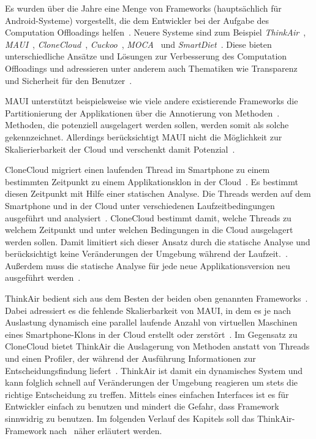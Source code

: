\documentclass{sigchi}
\begin{document}
Es wurden über die Jahre eine Menge von Frameworks (hauptsächlich für Android-Systeme) vorgestellt, die dem Entwickler bei der Aufgabe des Computation Offloadings helfen~\cite{o4}.
Neuere Systeme sind zum Beispiel \emph{ThinkAir}~\cite{thinkair}, \emph{MAUI}~\cite{maui}, \emph{CloneCloud}~\cite{clonecloud}, \emph{Cuckoo}~\cite{cuckoo}, \emph{MOCA}~\cite{moca} und \emph{SmartDiet}~\cite{smartdiet}.
Diese bieten unterschiedliche Ansätze und Lösungen zur Verbesserung des Computation Offloadings und adressieren unter anderem auch Thematiken wie Transparenz und Sicherheit für den Benutzer~\cite{o4}.

MAUI unterstützt beispielsweise wie viele andere existierende Frameworks die Partitionierung der Applikationen über die Annotierung von Methoden~\cite{maui}.
Methoden, die potenziell ausgelagert werden sollen, werden somit als solche gekennzeichnet.
Allerdings berücksichtigt MAUI nicht die Möglichkeit zur Skalierierbarkeit der Cloud und verschenkt damit Potenzial~\cite{maui, thinkair}.

CloneCloud migriert einen laufenden Thread im Smartphone zu einem bestimmten Zeitpunkt zu einem Applikationsklon in der Cloud~\cite{clonecloud}.
Es bestimmt diesen Zeitpunkt mit Hilfe einer statischen Analyse.
Die Threads werden auf dem Smartphone und in der Cloud unter verschiedenen Laufzeitbedingungen ausgeführt und analysiert~\cite{clonecloud}.
CloneCloud bestimmt damit, welche Threads zu welchem Zeitpunkt und unter welchen Bedingungen in die Cloud ausgelagert werden sollen.
Damit limitiert sich dieser Ansatz durch die statische Analyse und berücksichtigt keine Veränderungen der Umgebung während der Laufzeit.~\cite{thinkair}.
Außerdem muss die statische Analyse für jede neue Applikationsversion neu ausgeführt werden~\cite{thinkair}.

ThinkAir bedient sich aus dem Besten der beiden oben genannten Frameworks~\cite{thinkair}.
Dabei adressiert es die fehlende Skalierbarkeit von MAUI, in dem es je nach Auslastung dynamisch eine parallel laufende Anzahl von virtuellen Maschinen eines Smartphone-Klons in der Cloud erstellt oder zerstört~\cite{thinkair}.
Im Gegensatz zu CloneCloud bietet ThinkAir die Auslagerung von Methoden anstatt von Threads und einen Profiler, der während der Ausführung Informationen zur Entscheidungsfindung liefert~\cite{thinkair}.
ThinkAir ist damit ein dynamisches System und kann folglich schnell auf Veränderungen der Umgebung reagieren um stets die richtige Entscheidung zu treffen.
Mittels eines einfachen Interfaces ist es für Entwickler einfach zu benutzen und mindert die Gefahr, dass Framework sinnwidrig zu benutzen.
Im folgenden Verlauf des Kapitels soll das ThinkAir-Framework nach~\cite{thinkair} näher erläutert werden. 
\end{document}

